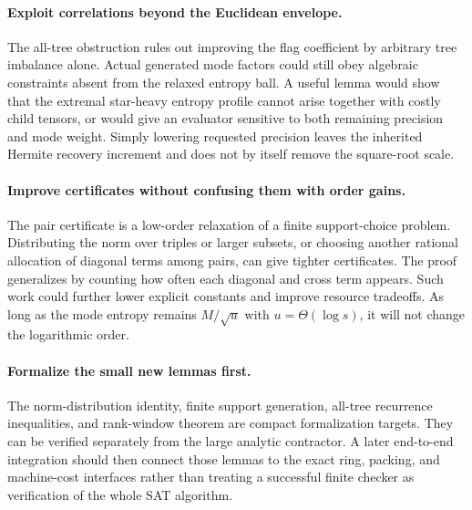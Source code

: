 \paragraph{Exploit correlations beyond the Euclidean envelope.}
The all-tree obstruction rules out improving the flag coefficient by
arbitrary tree imbalance alone. Actual generated mode factors could still
obey algebraic constraints absent from the relaxed entropy ball. A useful
lemma would show that the extremal star-heavy entropy profile cannot
arise together with costly child tensors, or would give an evaluator
sensitive to both remaining precision and mode weight. Simply lowering
requested precision leaves the inherited Hermite recovery increment and
does not by itself remove the square-root scale.

\paragraph{Improve certificates without confusing them with order gains.}
The pair certificate is a low-order relaxation of a finite support-choice
problem. Distributing the norm over triples or larger subsets, or choosing
another rational allocation of diagonal terms among pairs, can give tighter
certificates. The proof generalizes by counting how often each diagonal and
cross term appears. Such work could further lower explicit constants and
improve resource tradeoffs. As long as the mode entropy remains
$M/\sqrt u$ with $u=\Theta(\log s)$, it will not change the logarithmic order.

\paragraph{Formalize the small new lemmas first.}
The norm-distribution identity, finite support generation, all-tree recurrence
inequalities, and rank-window theorem are compact formalization targets.
They can be verified separately from the large analytic contractor. A later
end-to-end integration should then connect those lemmas to the exact ring,
packing, and machine-cost interfaces rather than treating a successful
finite checker as verification of the whole SAT algorithm.
